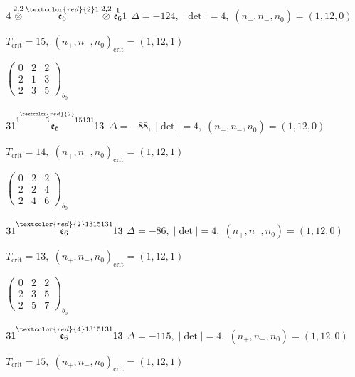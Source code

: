 \documentclass[10pt]{article}
\begin{document}
\smallskip

$4\overset{2,2}{\otimes}\overset{\textcolor{red}{2}1}{\mathfrak{e}_6}\overset{2,2}{\otimes}\overset{1}{\mathfrak{e}_6}1$ \quad $\Delta=-124,\; |\det|=4,\; (n_+,n_-,n_0)=(1,12,0)$

\hspace{1em}$T_{\text{crit}}=15,\; (n_+,n_-,n_0)_{\text{crit}}=(1,12,1)$

\hspace{2em}$\left(\begin{smallmatrix}0 & 2 & 2 \\ 2 & 1 & 3 \\ 2 & 3 & 5\end{smallmatrix}\right)_{\!b_0}$

\smallskip

$31\overset{1\overset{\textcolor{red}{2}}{3}15131}{\mathfrak{e}_6}13$ \quad $\Delta=-88,\; |\det|=4,\; (n_+,n_-,n_0)=(1,12,0)$

\hspace{1em}$T_{\text{crit}}=14,\; (n_+,n_-,n_0)_{\text{crit}}=(1,12,1)$

\hspace{2em}$\left(\begin{smallmatrix}0 & 2 & 2 \\ 2 & 2 & 4 \\ 2 & 4 & 6\end{smallmatrix}\right)_{\!b_0}$

$31\overset{\textcolor{red}{2}1315131}{\mathfrak{e}_6}13$ \quad $\Delta=-86,\; |\det|=4,\; (n_+,n_-,n_0)=(1,12,0)$

\hspace{1em}$T_{\text{crit}}=13,\; (n_+,n_-,n_0)_{\text{crit}}=(1,12,1)$

\hspace{2em}$\left(\begin{smallmatrix}0 & 2 & 2 \\ 2 & 3 & 5 \\ 2 & 5 & 7\end{smallmatrix}\right)_{\!b_0}$

$31\overset{\textcolor{red}{4}1315131}{\mathfrak{e}_6}13$ \quad $\Delta=-115,\; |\det|=4,\; (n_+,n_-,n_0)=(1,12,0)$

\hspace{1em}$T_{\text{crit}}=15,\; (n_+,n_-,n_0)_{\text{crit}}=(1,12,1)$
\end{document}
